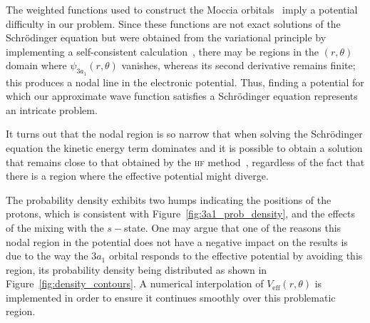 The weighted functions used to construct the Moccia
orbitals~\cite{Moccia_1964} imply a potential difficulty in our
problem. Since these functions are not exact solutions of the
Schr\"{o}dinger equation but were obtained from the variational
principle by implementing a self-consistent
calculation~\cite{Moccia_JCP_2164}, there may be regions in the
$(r,\theta)$ domain where $\psi_{3a_{1}}(r,\theta)$ vanishes, whereas
its second derivative remains finite; this produces a nodal line in
the electronic potential. Thus, finding a potential for which our
approximate wave function satisfies a Schr\"{o}dinger equation
represents an intricate problem.

It turns out that the nodal region is so narrow that when solving the
Schr\"{o}dinger equation the kinetic energy term dominates and it is
possible to obtain a solution that remains close to that obtained by
the \textsc{hf} method~\cite{Moccia_1964}, regardless of the fact that
there is a region where the effective potential might diverge.

The probability density exhibits two humps indicating the positions of
the protons, which is consistent with
Figure~\ref{fig:3a1_prob_density}, and the effects of the mixing with
the $s-$state. One may argue that one of the reasons this nodal region
in the potential does not have a negative impact on the results is due
to the way the $3a_{1}$ orbital responds to the effective potential by
avoiding this region, its probability density being distributed as
shown in Figure~\ref{fig:density_contours}. A numerical interpolation
of $V_{\mathrm{eff}}(r,\theta)$ is implemented in order to ensure it
continues smoothly over this problematic region.

